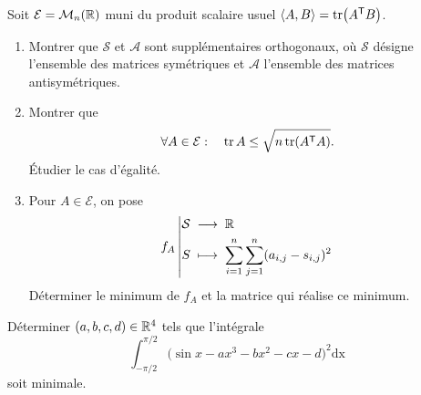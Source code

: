 \documentclass{book}
\begin{document}
 \begin{Exercice}
Soit $\mathcal{E} = \mathcal{M}_{n}(\mathbb{R})$ muni du produit scalaire usuel
$\langle A,B\rangle = \operatorname{tr}\bigl(A^{\mathsf {T}} B\bigr)$.
\begin{enumerate}
\item Montrer que $\mathcal{S}$ et $\mathcal{A}$ sont supplémentaires orthogonaux,
  où $\mathcal{S}$ désigne l'ensemble des matrices symétriques
  et $\mathcal{A}$ l'ensemble des matrices antisymétriques.
\item Montrer que
  \[ \forall A\in\mathcal{E} :\quad \operatorname{tr} A \leq \sqrt{n\operatorname{tr}(A^{\mathsf {T}} A)}. \]
  Étudier le cas d'égalité.
\item Pour $A\in\mathcal{E}$, on pose
  \[ {f_A}\left|\begin{aligned}{\mathcal{S}}&\;\longrightarrow\;{\mathbb{R}}\\{S}&\;\longmapsto\;{\sum_{i=1}^n \sum_{j=1}^n (a_{i,j} - s_{i,j})^2}\end{aligned}\right. \]
  Déterminer le minimum de $f_A$ et la matrice qui réalise ce minimum.
\end{enumerate}
\end{Exercice}
 \begin{Exercice}[Optimum]
Déterminer $(a,b,c,d)\in\mathbb{R}^4$ tels que l'intégrale
\[ \int_{-\pi/2}^{\pi/2} \Big( \sin x - ax^3 - bx^2 - cx - d \Big)^2 \mathrm{dx} \]
soit minimale.
\end{Exercice}
\end{document}
